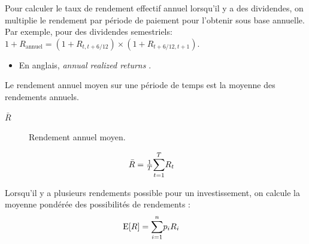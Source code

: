 \documentclass[10pt, french]{article}
\begin{document}
\begin{multicols*}{2}
\begin{definitionNOHFILL}
\begin{definitionNOHFILLsub}
Pour calculer le taux de rendement effectif annuel lorsqu'il y a des dividendes, on multiplie le rendement par période de paiement pour l'obtenir sous base annuelle.	\\

Par exemple, pour des dividendes semestriels: $1 + R_{\text{annuel}}	=	(1 + R_{t, t + 6/12}) \times (1 + R_{t + 6/12, t + 1})$.

\begin{itemize}
	\item	En anglais, \og \textit{annual realized returns} \fg{}.
\end{itemize}
\end{definitionNOHFILLsub}

\begin{definitionNOHFILLsub}
Le rendement annuel moyen sur une période de temps est la moyenne des rendements annuels.

\begin{distributions}[Notation]
\begin{description}
	\item[$\bar{R}$]	Rendement annuel moyen.
\end{description}
\end{distributions}

\begin{align*}
	\bar{R}
	&=	\tfrac{1}{T} \overset{T}{\underset{t	=	1}{\sum}}R_{t}
\end{align*}
\end{definitionNOHFILLsub}
\end{definitionNOHFILL}

\begin{definitionNOHFILL}
Lorsqu'il y a plusieurs rendements possible pour un investissement, on calcule la moyenne pondérée des possibilités de rendements : 
\begin{align*}
	\text{E}[R]
	&=	\overset{n}{\underset{i	=	1}{\sum}} p_{i}R_{i}
\end{align*}
\end{definitionNOHFILL}


\end{multicols*}
\end{document}

